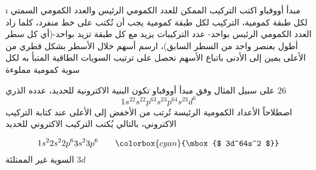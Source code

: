 \begin {corrige}[\thechapter ]{\i }
  مبدأ 
 أووفباو
اكتب التركيب 
الممكن للعدد الكمومي الرئيس والعدد الكمومي السمتي لكل طبقة كمومية، التركيب لكل طبقة كمومية يجب أن تُكتب على خط منفرد، كلما زاد العدد الكمومي الرئيس بواحد- عدد التركيبات يزيد مع كل طبقة تزيد بواحد-(أي كل سطر أطول بعنصر واحد من  السطر السابق)، ارسم أسهم خلال الأسطر بشكل قطري من الأعلى يمين إلى الأدنى  
باتباع الأسهم
نحصل على ترتيب السويات الطاقية   المتبأ به      لكل سوية كمومية مملوءة          
  
على سبيل المثال
وفق مبدأ أووفباو تكون
البنية الاكترونية للحديد، عدده الذري $26$
$$1s^22s^22p^63s^23
p^64s^23d^6$$
اصطلاحاً الأعداد الكمومية الرئيسة تُرتب من الأخفض إلى الأعلى عند كتابة التركيب الاكتروني، بالتالي يُكتب التركيب الاكتروني للحديد 


 

$$1s^22s^22p^63s^23
p^6\qquad 
\colorbox{cyan}{\mbox {$ 3d^64s^2 $}}$$
السوية غير الممتلئة $3d$
\end {corrige}\par \vspace *{\spacebeforeexo }
